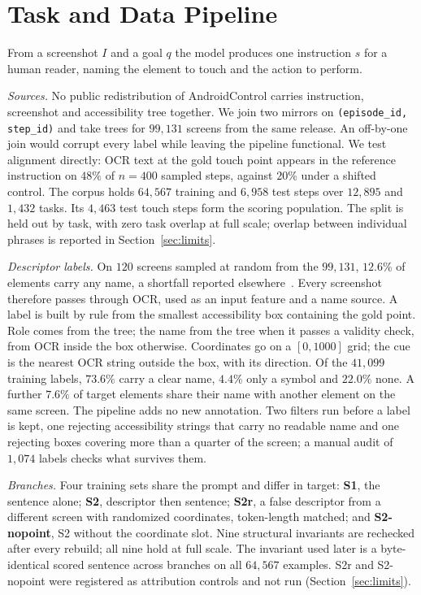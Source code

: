 \documentclass[conference]{IEEEtran}
\begin{document}
\section{Task and Data Pipeline}
\label{sec:data}

From a screenshot $I$ and a goal $q$ the model produces one instruction $s$ for a human reader,
naming the element to touch and the action to perform.

\emph{Sources.} No public redistribution of AndroidControl carries instruction, screenshot and
accessibility tree together. We join two mirrors on \texttt{(episode\_id, step\_id)} and take
trees for $99{,}131$ screens from the same release. An off-by-one join would corrupt every
label while leaving the pipeline functional. We test alignment directly: OCR text at the gold
touch point appears in the reference instruction on $48\%$ of $n=400$ sampled steps, against
$20\%$ under a shifted control. The corpus holds $64{,}567$ training and $6{,}958$ test steps
over $12{,}895$ and $1{,}432$ tasks. Its $4{,}463$ test touch steps form the scoring
population. The split is held out by task, with zero task overlap at full scale; overlap between
individual phrases is reported in Section~\ref{sec:limits}.

\emph{Descriptor labels.} On $120$ screens sampled at random from the $99{,}131$, $12.6\%$ of
elements carry any name, a shortfall reported elsewhere~\cite{chen2020}. Every screenshot
therefore passes through OCR, used as an input feature and a name source. A label is built by
rule from the smallest accessibility box containing the gold point. Role comes from the tree;
the name from the tree when it passes a validity check, from OCR inside the box otherwise.
Coordinates go on a $[0,1000]$ grid; the cue is the nearest OCR string outside the box, with
its direction. Of the $41{,}099$ training labels, $73.6\%$ carry a clear name, $4.4\%$ only a
symbol and $22.0\%$ none. A further $7.6\%$ of target elements share their name with another
element on the same screen. The pipeline adds no new annotation. Two filters run before a label is kept, one rejecting
accessibility strings that carry no readable name and one rejecting boxes covering more than a
quarter of the screen; a manual audit of $1{,}074$ labels checks what survives them.

\emph{Branches.} Four training sets share the prompt and differ in target: \textbf{S1}, the
sentence alone; \textbf{S2}, descriptor then sentence; \textbf{S2r}, a false descriptor from a
different screen with randomized coordinates, token-length matched; and \textbf{S2-nopoint}, S2
without the coordinate slot. Nine structural invariants are rechecked after every rebuild; all
nine hold at full scale. The invariant used later is a byte-identical scored sentence across
branches on all $64{,}567$ examples. S2r and S2-nopoint were registered as attribution controls
and not run (Section~\ref{sec:limits}).
\end{document}
